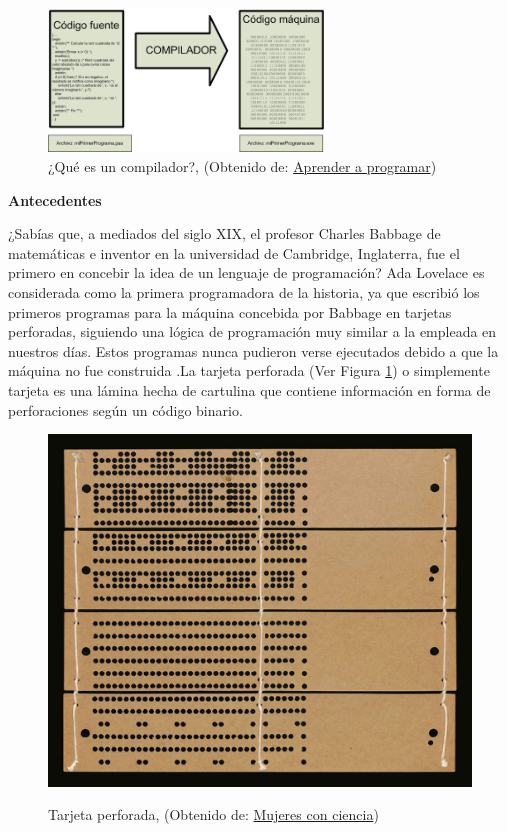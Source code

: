 \documentclass[11pt, letterpaper, spanish]{article}
\begin{document}
{    %
	\begin{figure}
	    \centering
		\caption{¿Qué es un compilador?, (Obtenido de: \href{https://www.aprenderaprogramar.com/index.php?option=com_content&view=article&id=895:ique-es-un-compilador-c-mejor-ide-o-entorno-de-desarrollo-codelite-codeblocks-geany-kdevelop-cu00506f&catid=82&Itemid=210}{Aprender a programar})}
		\includegraphics[width=0.65\textwidth]{Compilador.png}
	\end{figure}

\textbf{Antecedentes}

\par{¿Sabías que, a mediados del siglo XIX, el profesor Charles Babbage de matemáticas e inventor en la universidad de Cambridge, Inglaterra, fue el primero en concebir la idea de un lenguaje de programación? Ada Lovelace es considerada como la primera programadora de la historia, ya que escribió los primeros programas para la máquina concebida por Babbage en tarjetas perforadas, siguiendo una lógica de programación muy similar a la empleada en nuestros días. Estos programas nunca pudieron verse ejecutados debido a que la máquina no fue construida \cite{garfinkel_shevtsov_guo_2017}.La tarjeta perforada (Ver Figura \ref{Imagen_2}) o simplemente tarjeta es una lámina hecha de cartulina que contiene información en forma de perforaciones según un código binario.} 
\\
\begin{figure}
	    \centering
		\caption{Tarjeta perforada, (Obtenido de: \href{https://mujeresconciencia.com/2018/06/27/tarjetas-para-programar-el-mundo/}{Mujeres con ciencia})}
		\includegraphics[width=0.5 \textwidth]{Tarjeta.jpg}
		\label{Imagen_2}
	\end{figure}
	
}
\end{document}
